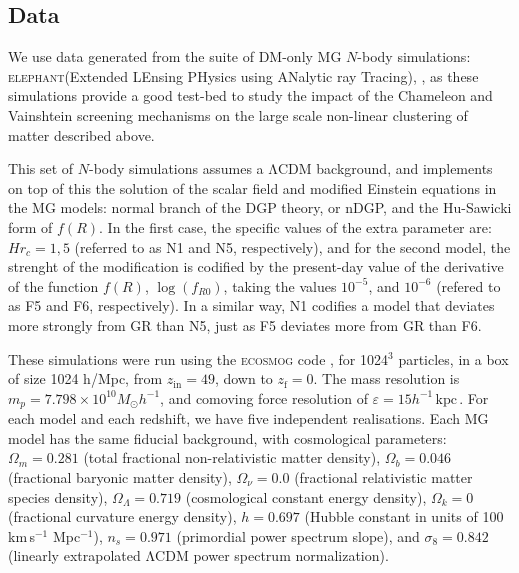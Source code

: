 \documentclass[%
 reprint,
groupedaddress,
nofootinbib,
nobibnotes,
 amsmath,amssymb,
 aps,
]{revtex4-2}
\newcommand{\lcdm}{$\mathrm{\Lambda CDM}$}
\newcommand{\kpch}{$h^{-1}\,\mbox{kpc}$\,}
\newcommand{\kps}{km\,s$^{-1}$\,}
\newcommand{\elephant}{\textsc{elephant}}
\newcommand{\<}{\langle}
\renewcommand{\>}{\rangle}
\begin{document}
\subsection{\label{subsec:data}Data}

We use data generated from the suite of DM-only MG $N$-body simulations: \elephant{}(Extended LEnsing PHysics using ANalytic ray Tracing), \citep{ALAM2020_ELEPHANT}, as these simulations provide a good test-bed to study the impact of the Chameleon and Vainshtein screening mechanisms on the large scale non-linear clustering of matter  described above.

This set of  $N$-body simulations assumes a \lcdm{} background, and implements on top of this the solution of the scalar field and modified Einstein equations in the MG models: normal branch of the DGP theory, or nDGP, and  the Hu-Sawicki form of $f(R)$. In the first case, the specific values of the extra parameter are: $Hr_c = 1, 5$ (referred to as  N1 and N5, respectively), and for the second model, the strenght of the modification is codified by the present-day value of the derivative of the function $f(R)$, $\log(f_{R0})$, taking the values $10^{-5}$, and $10^{-6}$ (refered to as F5 and F6, respectively).  In a similar way, N1 codifies a model that deviates more strongly from GR than N5, just as F5 deviates more from GR than F6. 




These simulations were run using the \textsc{ecosmog} code \cite{ECOSMOG_1,ECOSMOG_V_1,ECOSMOG_2}, for 1024$^{3}$ particles, in a box of size 1024 h/Mpc, from $z_\mathrm{in}=49$, down to $z_\mathrm{f}=0$. 
The mass resolution is $m_p=7.798\times10^{10}M_{\odot}h^{-1}$, and comoving force resolution of $\varepsilon=15$\kpch. 
For each model and each redshift, we have five independent realisations. 
Each MG model has the same fiducial background, with cosmological parameters: $\Omega_m=0.281$ (total fractional non-relativistic matter density), $\Omega_b = 0.046$ (fractional baryonic matter density),
$\Omega_\nu = 0.0$ (fractional relativistic matter species density), $\Omega_{\Lambda}=0.719$ (cosmological constant energy density), $\Omega_k=0$ (fractional curvature energy density), $h=0.697$ (Hubble constant in units of 100 \kps\,Mpc$^{-1}$), $n_s = 0.971$ (primordial power spectrum slope), and $\sigma_8 = 0.842$ (linearly extrapolated \lcdm{} power spectrum normalization). 
\end{document}
